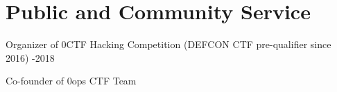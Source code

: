 \section*{Public and Community Service}
\begin{description}
\item Organizer of 0CTF Hacking Competition (DEFCON CTF pre-qualifier since 2016) -2018
\item Co-founder of 0ops CTF Team 
\end{description}
